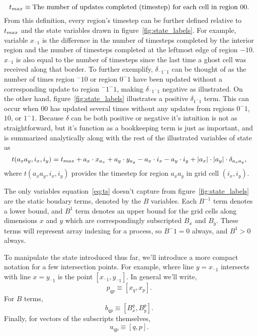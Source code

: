 \begin{equation}
  \text{$t_{max}$} \equiv \text{The number of updates completed (timestep) for each cell in region $00$}.
\end{equation}
From this definition, every region's timestep can be further defined relative to $\text{$t_{max}$}$ and the state
variables drawn in figure~\ref{fig:state_labels}.  For example, variable $x_{^-1}$ is the difference in the
 number of timesteps completed by the interior region and the number of timesteps completed at the leftmost edge
 of region $-10$.  $x_{^-1}$ is also equal to the number of timesteps since the last time a ghost cell was received along
 that border.  To further exemplify, $\delta_{^-1^-1}$ can be thought of as the number of times
region $^-10$ or region $0^-1$ have been updated without a corresponding update to region $^-1^-1$, making $\delta_{^-1^-1}$
negative as illustrated.  On the other hand, figure~\ref{fig:state_labels} illustrates a positive
 $\delta_{1^-1}$ term.  This can occur when $00$ has updated several times without
any updates from regions $0^-1$, $10$, or $1^-1$.  Because $\delta$ can be both positive or negative
it's intuition is not as straightforward, but it's function as a bookkeeping term is just as important, and
is summarized analytically along with the rest of the illustrated variables of state as
\begin{equation}
  t(a_xa_y,i_x,i_y) = \text{$t_{max}$} +
  a_x \cdot x_{a_x} + a_y \cdot y_{a_y} -
  a_x \cdot i_x - a_y \cdot i_y +
  |a_x|\cdot|a_y|\cdot\delta_{a_xa_y},
  \label{eq:ts}
\end{equation}
where $t(a_xa_y,i_x,i_y)$ provides the timestep for region $a_xa_y$ in grid cell $(i_x,i_y)$.

The only variables equation~\ref{eq:ts} doesn't capture from figure~\ref{fig:state_labels} are the
static boudary terms, denoted by the $B$ variables.  Each $B^{-1}$ term denotes a lower bound, and $B^1$
 term
denotes an upper bound for the grid cells along dimensions $x$ and $y$ which are
correspondingly subscripted $B_x$ and $B_y$.
  These terms will represent array indexing for a process, so $B^-1 = 0$ always, and $B^1 > 0$ always.

  To manipulate the state introduced thus far, we'll introduce a more compact
  notation for a few intersection points.  For example,
  where line $y = x_{^-1}$ intersects with line $x = y_{^-1}$ is
  the point $[x_{^-1}, y_{^-1}]$.  In general we'll write,
  \begin{equation} \label{eq:p_sm}
    p_{qp} \equiv [x_q, x_p].
  \end{equation}
For $B$ terms,
\begin{equation}
  b_{qp} \equiv [B_x^q, B_y^p].
  \label{eq:b_sm}
\end{equation}
Finally, for vectors of the subscripts themselves,
\begin{equation}
  u_{qp} \equiv [q, p].
  \label{eq:u_sm}
\end{equation}


